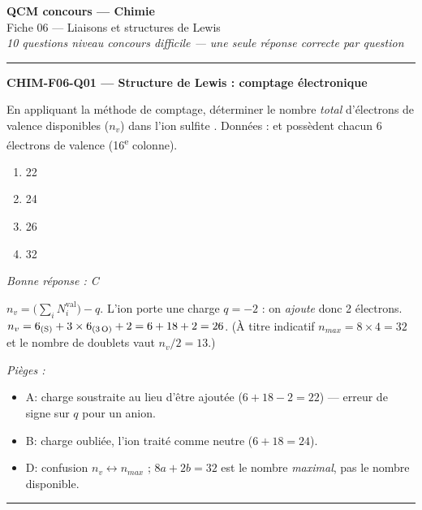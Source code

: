 \documentclass[11pt,a4paper]{article}
\begin{document}
\begin{center}
{\Large\bfseries QCM concours --- Chimie}\\[2pt]
{\large Fiche 06 --- Liaisons et structures de Lewis}\\[2pt]
\textit{10 questions niveau concours difficile --- une seule réponse correcte par question}
\end{center}
\vspace{6pt}\hrule\vspace{10pt}

\noindent\textbf{CHIM-F06-Q01 --- Structure de Lewis : comptage électronique}\par
En appliquant la méthode de comptage, déterminer le nombre \emph{total} d'électrons de valence
disponibles ($n_v$) dans l'ion sulfite . Données :  et  possèdent chacun
6 électrons de valence (16\textsuperscript{e} colonne).
\begin{enumerate}[label=\Alph*)]
\item \num{22}
\item \num{24}
\item \num{26}
\item \num{32}
\end{enumerate}
\textit{Bonne réponse : C}\par
$n_v = \big(\sum_i N_i^{\text{val}}\big) - q$. L'ion porte une charge $q=-2$ : on \emph{ajoute} donc
2 électrons. $n_v = 6_{(\ce{S})} + 3\times 6_{(\text{3\,}\ce{O})} + 2 = 6+18+2 = 26$.
(À titre indicatif $n_{max}=8\times4=32$ et le nombre de doublets vaut $n_v/2 = 13$.)\par
\textit{Pièges :}
\begin{itemize}
\item A: charge soustraite au lieu d'être ajoutée ($6+18-2=22$) --- erreur de signe sur $q$ pour un anion.
\item B: charge oubliée, l'ion traité comme neutre ($6+18=24$).
\item D: confusion $n_v \leftrightarrow n_{max}$ ; $8a+2b=32$ est le nombre \emph{maximal}, pas le nombre disponible.
\end{itemize}
\vspace{8pt}\hrule\vspace{8pt}
\end{document}
